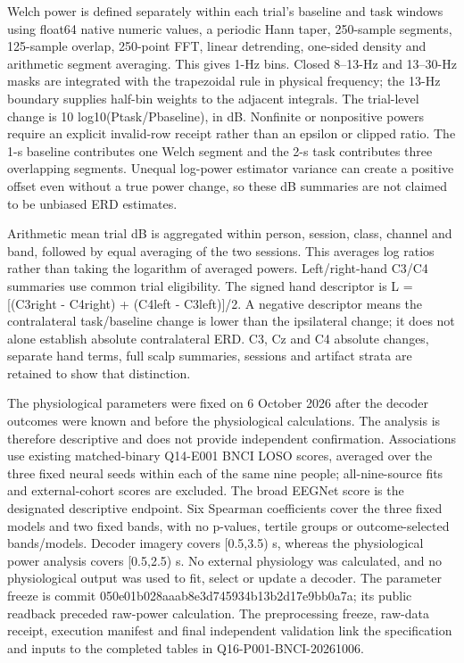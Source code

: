 \documentclass[11pt]{article}
\begin{document}
Welch power is defined separately within each trial's baseline and task windows using float64 native numeric values, a periodic Hann taper, 250-sample segments, 125-sample overlap, 250-point FFT, linear detrending, one-sided density and arithmetic segment averaging. This gives 1-Hz bins. Closed 8--13-Hz and 13--30-Hz masks are integrated with the trapezoidal rule in physical frequency; the 13-Hz boundary supplies half-bin weights to the adjacent integrals. The trial-level change is 10 log10(Ptask/Pbaseline), in dB. Nonfinite or nonpositive powers require an explicit invalid-row receipt rather than an epsilon or clipped ratio. The 1-s baseline contributes one Welch segment and the 2-s task contributes three overlapping segments. Unequal log-power estimator variance can create a positive offset even without a true power change, so these dB summaries are not claimed to be unbiased ERD estimates.

Arithmetic mean trial dB is aggregated within person, session, class, channel and band, followed by equal averaging of the two sessions. This averages log ratios rather than taking the logarithm of averaged powers. Left/right-hand C3/C4 summaries use common trial eligibility. The signed hand descriptor is L = [(C3right - C4right) + (C4left - C3left)]/2. A negative descriptor means the contralateral task/baseline change is lower than the ipsilateral change; it does not alone establish absolute contralateral ERD. C3, Cz and C4 absolute changes, separate hand terms, full scalp summaries, sessions and artifact strata are retained to show that distinction.

The physiological parameters were fixed on 6 October 2026 after the decoder outcomes were known and before the physiological calculations. The analysis is therefore descriptive and does not provide independent confirmation. Associations use existing matched-binary Q14-E001 BNCI LOSO scores, averaged over the three fixed neural seeds within each of the same nine people; all-nine-source fits and external-cohort scores are excluded. The broad EEGNet score is the designated descriptive endpoint. Six Spearman coefficients cover the three fixed models and two fixed bands, with no p-values, tertile groups or outcome-selected bands/models. Decoder imagery covers [0.5,3.5) s, whereas the physiological power analysis covers [0.5,2.5) s. No external physiology was calculated, and no physiological output was used to fit, select or update a decoder. The parameter freeze is commit 050e01b028aaab8e3d745934b13b2d17e9bb0a7a; its public readback preceded raw-power calculation. The preprocessing freeze, raw-data receipt, execution manifest and final independent validation link the specification and inputs to the completed tables in Q16-P001-BNCI-20261006.
\end{document}
